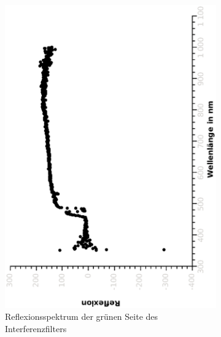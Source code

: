 \documentclass{article}
\begin{document}
\begin{figure}[H]
\begin{subfigure}[h]{0.4\textwidth}
\includegraphics[width=\textwidth ,angle=-90]{eps/interreflgruen.eps}
\caption{Reflexionsspektrum \label{fig:greenrefl} der grünen Seite des Interferenzfilters}
\end{subfigure}
\begin{subfigure}[h]{0.4\textwidth}

\end{subfigure}
\end{figure}
\end{document}
